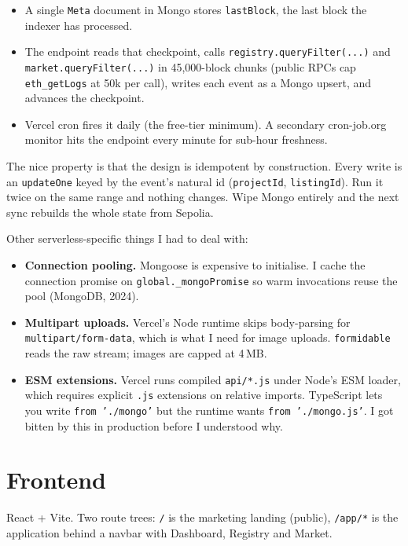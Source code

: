 \documentclass[11pt,a4paper]{article}
\begin{document}
\begin{itemize}[leftmargin=1.3em, itemsep=2pt]
    \item A single \texttt{Meta} document in Mongo stores
    \texttt{lastBlock}, the last block the indexer has processed.
    \item The endpoint reads that checkpoint, calls
    \texttt{registry.queryFilter(...)} and
    \texttt{market.queryFilter(...)} in 45,000-block chunks (public RPCs
    cap \texttt{eth\_getLogs} at 50k per call), writes each event as a
    Mongo upsert, and advances the checkpoint.
    \item Vercel cron fires it daily (the free-tier minimum). A
    secondary cron-job.org monitor hits the endpoint every minute for
    sub-hour freshness.
\end{itemize}

The nice property is that the design is idempotent by construction.
Every write is an \texttt{updateOne} keyed by the event's natural id
(\texttt{projectId}, \texttt{listingId}). Run it twice on the same
range and nothing changes. Wipe Mongo entirely and the next sync
rebuilds the whole state from Sepolia.

Other serverless-specific things I had to deal with:

\begin{itemize}[leftmargin=1.3em, itemsep=2pt]
    \item \textbf{Connection pooling.} Mongoose is expensive to
    initialise. I cache the connection promise on
    \texttt{global.\_mongoPromise} so warm invocations reuse the pool
    (MongoDB, 2024).
    \item \textbf{Multipart uploads.} Vercel's Node runtime skips
    body-parsing for \texttt{multipart/form-data}, which is what I need
    for image uploads. \texttt{formidable} reads the raw stream; images
    are capped at 4\,MB.
    \item \textbf{ESM extensions.} Vercel runs compiled
    \texttt{api/*.js} under Node's ESM loader, which requires explicit
    \texttt{.js} extensions on relative imports. TypeScript lets you
    write \texttt{from './mongo'} but the runtime wants
    \texttt{from './mongo.js'}. I got bitten by this in production
    before I understood why.
\end{itemize}

\section{Frontend}
React + Vite. Two route trees: \texttt{/} is the marketing landing
(public), \texttt{/app/*} is the application behind a navbar with
Dashboard, Registry and Market.
\end{document}
